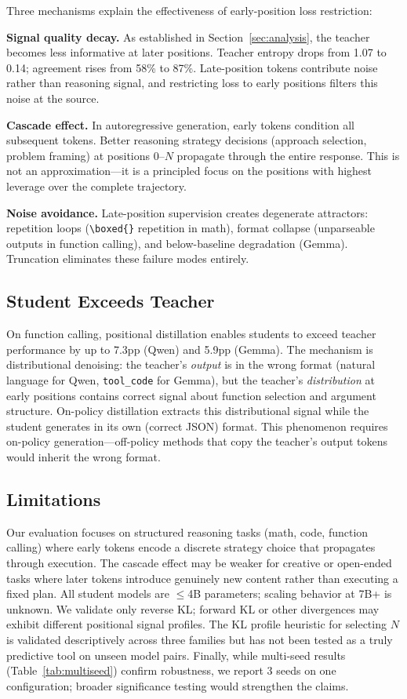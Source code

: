 \documentclass[10pt]{article}
\newcommand{\bboxed}{\texttt{\textbackslash boxed\{\}}}
\begin{document}
Three mechanisms explain the effectiveness of early-position loss restriction:

\textbf{Signal quality decay.} As established in Section~\ref{sec:analysis}, the teacher becomes less informative at later positions. Teacher entropy drops from 1.07 to 0.14; agreement rises from 58\% to 87\%. Late-position tokens contribute noise rather than reasoning signal, and restricting loss to early positions filters this noise at the source.

\textbf{Cascade effect.} In autoregressive generation, early tokens condition all subsequent tokens. Better reasoning strategy decisions (approach selection, problem framing) at positions 0--$N$ propagate through the entire response. This is not an approximation---it is a principled focus on the positions with highest leverage over the complete trajectory.

\textbf{Noise avoidance.} Late-position supervision creates degenerate attractors: repetition loops (\bboxed{} repetition in math), format collapse (unparseable outputs in function calling), and below-baseline degradation (Gemma). Truncation eliminates these failure modes entirely.

\subsection{Student Exceeds Teacher}

On function calling, positional distillation enables students to exceed teacher performance by up to 7.3pp (Qwen) and 5.9pp (Gemma). The mechanism is distributional denoising: the teacher's \emph{output} is in the wrong format (natural language for Qwen, \texttt{tool\_code} for Gemma), but the teacher's \emph{distribution} at early positions contains correct signal about function selection and argument structure. On-policy distillation extracts this distributional signal while the student generates in its own (correct JSON) format. This phenomenon requires on-policy generation---off-policy methods that copy the teacher's output tokens would inherit the wrong format.

\subsection{Limitations}

Our evaluation focuses on structured reasoning tasks (math, code, function calling) where early tokens encode a discrete strategy choice that propagates through execution. The cascade effect may be weaker for creative or open-ended tasks where later tokens introduce genuinely new content rather than executing a fixed plan. All student models are $\leq$4B parameters; scaling behavior at 7B+ is unknown. We validate only reverse KL; forward KL or other divergences may exhibit different positional signal profiles. The KL profile heuristic for selecting $N$ is validated descriptively across three families but has not been tested as a truly predictive tool on unseen model pairs. Finally, while multi-seed results (Table~\ref{tab:multiseed}) confirm robustness, we report 3 seeds on one configuration; broader significance testing would strengthen the claims.
\end{document}
